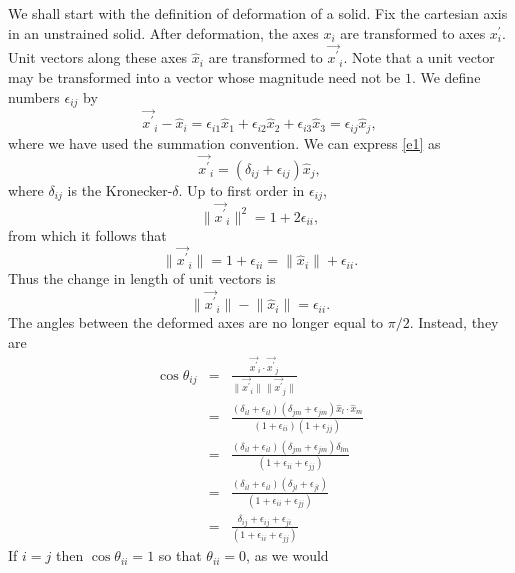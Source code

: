 \documentclass{article}
\newcommand{\op}{\prime}
\begin{document}
We shall start with the definition of deformation of a solid. Fix the cartesian
axis in an unstrained solid. After deformation, the axes $x_i$ are transformed
to axes $x_i^\op$. Unit vectors along these axes $\hat{x}_i$ are transformed to
$\vec{x^\op}_i$. Note that a unit vector may be transformed into a vector whose
magnitude need not be $1$. We define numbers $\epsilon_{ij}$ by
\begin{equation}\label{e1}
\vec{x^\op}_i - \hat{x}_i = \epsilon_{i1}\hat{x}_1 + \epsilon_{i2}\hat{x}_2
+ \epsilon_{i3}\hat{x}_3 = \epsilon_{ij}\hat{x}_j,
\end{equation}
where we have used the summation convention. We can express \eqref{e1} as
\begin{equation}\label{e2}
\vec{x^\op}_i = (\delta_{ij} + \epsilon_{ij})\hat{x}_j,
\end{equation}
where $\delta_{ij}$ is the Kronecker-$\delta$. Up to first order in 
$\epsilon_{ij}$, 
\begin{equation}\label{e3}
\lVert\vec{x^\op}_i\rVert^2 = 1 + 2\epsilon_{ii},
\end{equation}
from which it follows that
\begin{equation}\label{e4}
\lVert\vec{x^\op}_i\rVert = 1 + \epsilon_{ii} = \lVert\hat{x}_i\rVert +
\epsilon_{ii}.
\end{equation}
Thus the change in length of unit vectors is
\begin{equation}\label{e5}
\lVert\vec{x^\op}_i\rVert - \lVert\hat{x}_i\rVert = \epsilon_{ii}.
\end{equation}
The angles between the deformed axes are no longer equal to $\pi/2$. Instead,
they are
\begin{eqnarray*}
\cos\theta_{ij} &=& \frac{\vec{x^\op}_i \cdot \vec{x^\op}_j}
{\lVert\vec{x^\op}_i\rVert\lVert\vec{x^\op}_j\rVert}  \\
&=& \frac{(\delta_{il} + \epsilon_{il})(\delta_{jm} + \epsilon_{jm})\hat{x}_l
\cdot\hat{x}_m}{(1 + \epsilon_{ii})(1 + \epsilon_{jj})}  \\
&=& \frac{(\delta_{il} + \epsilon_{il})(\delta_{jm} + \epsilon_{jm})\delta_{lm}}
{(1 + \epsilon_{ii} + \epsilon_{jj})}  \\
&=& \frac{(\delta_{il} + \epsilon_{il})(\delta_{jl} + \epsilon_{jl})}
{(1 + \epsilon_{ii} + \epsilon_{jj})}  \\
&=& \frac{\delta_{ij} + \epsilon_{ij} + \epsilon_{ji}}
{(1 + \epsilon_{ii} + \epsilon_{jj})}  
\end{eqnarray*}
If $i = j$ then $\cos\theta_{ii} = 1$ so that $\theta_{ii} = 0$, as we would 
\end{document}
